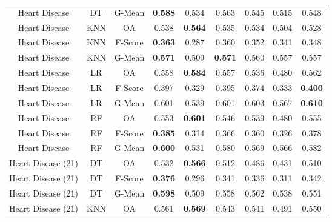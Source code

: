 \begin{longtable}{ccccccccc}
     Heart Disease &         DT &  G-Mean & \textbf{0.588} &          0.534 &          0.563 &          0.545 &          0.515 &          0.548 \\
     Heart Disease &        KNN &      OA &          0.538 & \textbf{0.564} &          0.535 &          0.534 &          0.504 &          0.528 \\
     Heart Disease &        KNN & F-Score & \textbf{0.363} &          0.287 &          0.360 &          0.352 &          0.341 &          0.348 \\
     Heart Disease &        KNN &  G-Mean & \textbf{0.571} &          0.509 & \textbf{0.571} &          0.560 &          0.557 &          0.557 \\
     Heart Disease &         LR &      OA &          0.558 & \textbf{0.584} &          0.557 &          0.536 &          0.480 &          0.562 \\
     Heart Disease &         LR & F-Score &          0.397 &          0.329 &          0.395 &          0.374 &          0.333 & \textbf{0.400} \\
     Heart Disease &         LR &  G-Mean &          0.601 &          0.539 &          0.601 &          0.603 &          0.567 & \textbf{0.610} \\
     Heart Disease &         RF &      OA &          0.553 & \textbf{0.601} &          0.546 &          0.539 &          0.480 &          0.555 \\
     Heart Disease &         RF & F-Score & \textbf{0.385} &          0.314 &          0.366 &          0.360 &          0.326 &          0.378 \\
     Heart Disease &         RF &  G-Mean & \textbf{0.600} &          0.531 &          0.580 &          0.569 &          0.566 &          0.582 \\
Heart Disease (21) &         DT &      OA &          0.532 & \textbf{0.566} &          0.512 &          0.486 &          0.431 &          0.510 \\
Heart Disease (21) &         DT & F-Score & \textbf{0.376} &          0.296 &          0.341 &          0.336 &          0.311 &          0.342 \\
Heart Disease (21) &         DT &  G-Mean & \textbf{0.598} &          0.509 &          0.558 &          0.562 &          0.538 &          0.551 \\
Heart Disease (21) &        KNN &      OA &          0.561 & \textbf{0.569} &          0.543 &          0.541 &          0.491 &          0.550 \\

\end{longtable}
